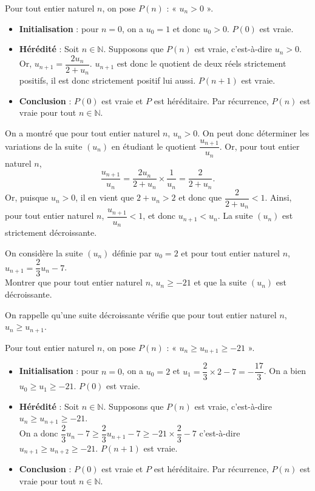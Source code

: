 \documentclass[11pt,fleqn]{book} %
\begin{document}
\begin{solution}Pour tout entier naturel \(n\), on pose \(P(n)\) : « \(u_n > 0\) ».

\begin{itemize}\item \textbf{Initialisation} : pour \(n=0\), on a \(u_0=1\) et donc \(u_0 > 0\). \(P(0)\) est vraie.
\item \textbf{Hérédité} : Soit \(n\in\mathbb{N}\). Supposons que \(P(n)\) est vraie, c'est-à-dire \(u_n > 0\). Or, \(u_{n+1}=\dfrac{2u_n}{2+u_n}\). \(u_{n+1}\) est donc le quotient de deux réels strictement positifs, il est donc strictement positif lui aussi. \(P(n+1)\) est vraie.
\item \textbf{Conclusion} : \(P(0)\) est vraie et \(P\) est héréditaire. Par récurrence, \(P(n)\) est vraie pour tout \(n\in\mathbb{N}\).
\end{itemize}
 On a montré que pour tout entier naturel \(n\), \(u_n > 0\). On peut donc déterminer les variations de la suite \((u_n)\) en étudiant le quotient \(\dfrac{u_{n+1}}{u_n}\). Or, pour tout entier naturel \(n\), 
\[\dfrac{u_{n+1}}{u_n} = \dfrac{2u_n}{2+u_n} \times \dfrac{1}{u_n} = \dfrac{2}{2+u_n}.\]
Or, puisque \(u_n > 0\), il en vient que \( 2+u_n > 2\) et donc que \( \dfrac{2}{2+u_n} < 1\). Ainsi, pour tout entier naturel \(n\), \(\dfrac{u_{n+1}}{u_n} < 1\), et donc \(u_{n+1} < u_n\). La suite \((u_n)\) est strictement décroissante.\end{solution}

\begin{exercise}
On considère la suite $(u_n)$ définie par $u_0=2$ et pour tout entier naturel $n$, $u_{n+1}=\dfrac{2}{3}u_n-7$. \\Montrer que pour tout entier naturel $n$, $u_n\geqslant -21$ et que la suite $(u_n)$ est décroissante.\end{exercise}


\begin{solution}
On rappelle qu'une suite décroissante vérifie que pour tout entier naturel $n$, $u_n \geqslant u_{n+1}$.

Pour tout entier naturel $n$, on pose $P(n)$ : « $u_n \geqslant u_{n+1} \geqslant -21$ ».

\begin{itemize}
\item \textbf{Initialisation} : pour $n=0$, on a $u_0=2$ et $u_1=\dfrac{2}{3}\times 2-7=-\dfrac{17}{3}$. On a bien  $u_0 \geqslant u_{1} \geqslant -21$. $P(0)$ est vraie.
\item \textbf{Hérédité} : Soit $n\in\mathbb{N}$. Supposons que $P(n)$ est vraie, c'est-à-dire $u_n \geqslant u_{n+1} \geqslant -21$.\\ On a donc $\dfrac{2}{3}u_n-7 \geqslant \dfrac{2}{3}u_{n+1}-7 \geqslant -21 \times \dfrac{2}{3} - 7$ c'est-à-dire $u_{n+1} \geqslant u_{n+2} \geqslant -21$. $P(n+1)$ est vraie.
\item \textbf{Conclusion} : $P(0)$ est vraie et $P$ est héréditaire. Par récurrence, $P(n)$ est vraie pour tout $n\in\mathbb{N}$.
\end{itemize}\end{solution}
\end{document}
